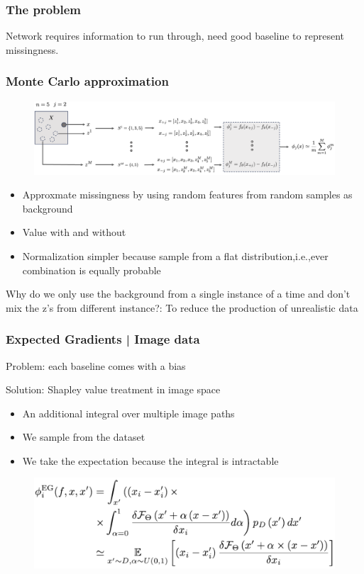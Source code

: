 \subsubsection{The problem}
Network requires information to run through, need good baseline to represent missingness.
\subsubsection{Monte Carlo approximation}
\begin{figure}[!h]
    \includegraphics[width = \columnwidth]{figures/XAI3/ShapleyValuesMonteCarlo.png}
\end{figure}
\begin{itemize}
    \item Approxmate missingness by using random features from random samples as background
    \item Value with and without
    \item Normalization simpler because sample from a flat distribution,i.e.,ever combination is equally probable
\end{itemize}
Why do we only use the background from a single instance of a time and don't mix the z's from different instance?:
To reduce the production of unrealistic data

\subsubsection{Expected Gradients | Image data}
Problem: each baseline comes with a bias

Solution: Shapley value treatment in image space
\begin{itemize}
    \item An additional integral over multiple image paths
    \item We sample from the dataset
    \item We take the expectation because the integral is intractable
\end{itemize}
\begin{figure}[!h]
    \includegraphics[width = \columnwidth]{figures/XAI3/ShapleyValuesXGRADFromula.png}
\end{figure}

